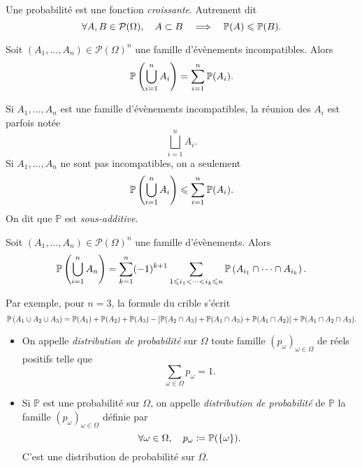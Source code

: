 \documentclass{magnolia}
\begin{document}
\begin{proposition}
Une probabilité est une fonction \emph{croissante}. Autrement dit
\[\forall A,B\in\mathcal{P}(\Omega),\quad A\subset B \quad\Longrightarrow\quad \mathbb{P}(A)\leqslant\mathbb{P}(B).\]
\end{proposition}

\begin{proposition}
Soit $(A_1,\ldots,A_n)\in\mathcal{P}(\Omega)^n$ une famille d'évènements incompatibles.
Alors
\[\mathbb{P}\left(\bigcup_{i=1}^n A_i\right)=\sum_{i=1}^n \mathbb{P}(A_i).\]
\end{proposition}

\begin{remarques}
\remarque Si $A_1,\ldots,A_n$ est une famille d'évènements incompatibles, la réunion des $A_i$ est parfois
  notée
  \[\bigsqcup_{i=1}^n A_i.\]
\remarque Si $A_1,\ldots,A_n$ ne sont pas incompatibles, on a seulement
  \[\mathbb{P}\left(\bigcup_{i=1}^n A_i\right)\leqslant\sum_{i=1}^n \mathbb{P}(A_i).\]
  On dit que $\mathbb{P}$ est \emph{sous-additive}. 
\end{remarques}


\begin{proposition}[nom={Formule du crible}]
Soit $(A_1,\ldots,A_n)\in\mathcal{P}(\Omega)^n$ une famille d'évènements. Alors
  \[\mathbb{P}\left(\bigcup_{i=1}^n A_n\right)=\sum_{k=1}^n (-1)^{k+1}
    \sum_{1\leqslant i_1<\cdots<i_k\leqslant n}
    \mathbb{P}\left(A_{i_1}\cap\cdots\cap A_{i_k}\right).\]
\end{proposition}

\begin{remarqueUnique}
\remarque   Par exemple, pour $n=3$, la formule du crible s'écrit
\[\mathbb{P}\left(A_1\cup A_2\cup A_3\right)=\mathbb{P}(A_1)+\mathbb{P}(A_2)+\mathbb{P}(A_3) - \left[\mathbb{P}(A_2\cap A_3)+\mathbb{P}(A_1\cap A_3)+\mathbb{P}(A_1\cap A_2)\right]+\mathbb{P}(A_1\cap A_2\cap A_3).\]
\end{remarqueUnique}


\begin{definition}
\begin{itemize}
\item On appelle \emph{distribution de probabilité} sur
  $\Omega$ toute famille $(p_{\omega})_{\omega\in\Omega}$ de réels positifs telle que
  \[\sum_{\omega\in\Omega} p_{\omega}=1.\]
\item Si $\mathbb{P}$ est une probabilité sur $\Omega$, on appelle \emph{distribution de
  probabilité} de $\mathbb{P}$ la famille $(p_{\omega})_{\omega\in\Omega}$ définie par
  \[\forall \omega\in\Omega,\quad p_{\omega}\coloneqq \mathbb{P}(\left\{\omega\right\}).\]
  C'est une distribution de probabilité sur $\Omega$.
\end{itemize}
\end{definition}
\end{document}

